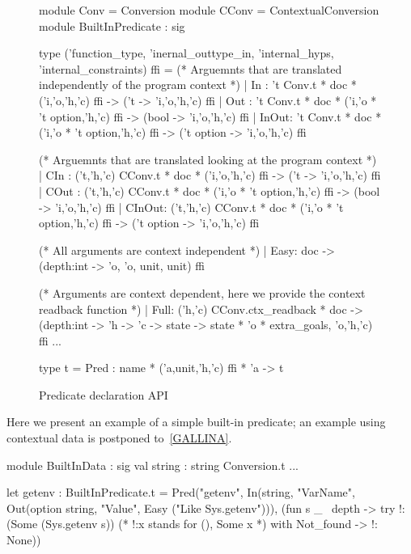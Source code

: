 \documentclass{these-ISSS}
\newenvironment{ocamlcode}
  {\VerbatimEnvironment\begin{ocamlbox}\begin{xocamlcode}}{\end{xocamlcode}
\end{ocamlbox}}
\begin{document}
\begin{figure}
\begin{minipage}{.9\textwidth}
\begin{ocamlcode}
module Conv = Conversion
module CConv = ContextualConversion
module BuiltInPredicate : sig

type ('function_type, 'inernal_outtype_in, 'internal_hyps, 'internal_constraints) ffi =
(* Arguemnts that are translated independently of the program context *)
| In   : 't Conv.t * doc * ('i,'o,'h,'c) ffi -> ('t -> 'i,'o,'h,'c) ffi
| Out  : 't Conv.t * doc * ('i,'o * 't option,'h,'c) ffi -> (bool -> 'i,'o,'h,'c) ffi
| InOut: 't Conv.t * doc * ('i,'o * 't option,'h,'c) ffi -> ('t option -> 'i,'o,'h,'c) ffi

(* Arguemnts that are translated looking at the program context *)
| CIn   : ('t,'h,'c) CConv.t * doc * ('i,'o,'h,'c) ffi -> ('t -> 'i,'o,'h,'c) ffi
| COut  : ('t,'h,'c) CConv.t * doc * ('i,'o * 't option,'h,'c) ffi -> (bool -> 'i,'o,'h,'c) ffi
| CInOut: ('t,'h,'c) CConv.t * doc * ('i,'o * 't option,'h,'c) ffi -> ('t option -> 'i,'o,'h,'c) ffi

(* All arguments are context independent *)
| Easy: doc -> (depth:int -> 'o, 'o, unit, unit) ffi

(* Arguments are context dependent, here we provide the context readback function *)
| Full: ('h,'c) CConv.ctx_readback * doc ->
    (depth:int -> 'h -> 'c -> state ->
      state * 'o * extra_goals, 'o,'h,'c) ffi
...

type t = Pred : name * ('a,unit,'h,'c) ffi * 'a -> t
\end{ocamlcode}
\end{minipage}
\caption{Predicate declaration API\label{fig:ffi}}
\end{figure}


Here we present an example of a simple built-in predicate; an example using
contextual data is postponed to~\cref{GALLINA}.

\begin{ocamlcode}
  module BuiltInData : sig
    val string : string Conversion.t
  ...

  let getenv : BuiltInPredicate.t =
    Pred("getenv",
      In(string,  "VarName",
      Out(option string, "Value",
      Easy ("Like Sys.getenv"))),
       (fun s _ ~depth ->
          try !:(Some (Sys.getenv s)) (* !:x  stands for  (), Some x *)
          with Not_found -> !: None))     
\end{ocamlcode}
\end{document}
